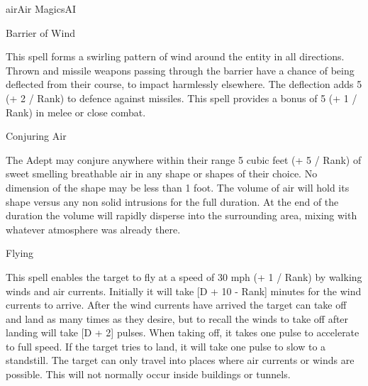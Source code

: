 \begin{College}[2.1]{air}{Air Magics}{AI}
\begin{spell}[S-4]{Barrier of Wind}

\begin{effects}
This spell forms a swirling pattern of wind around the entity in all
directions.  Thrown and missile weapons passing through the barrier
have a chance of being deflected from their course, to impact
harmlessly elsewhere.  The deflection adds 5 (+ 2 / Rank) to defence
against missiles.  This spell provides a bonus of 5 (+ 1 / Rank) in
melee or close combat.
\end{effects}
\end{spell}

\begin{spell}[S-5]{Conjuring Air}

\begin{effects}
The Adept may conjure anywhere within their range 5 cubic feet (+ 5 /
Rank) of sweet smelling breathable air in any shape or shapes of their
choice.  No dimension of the shape may be less than 1 foot.  The
volume of air will hold its shape versus any non solid intrusions for
the full duration. At the end of the duration the volume will rapidly
disperse into the surrounding area, mixing with whatever atmosphere
was already there.
\end{effects}
\end{spell}

\begin{spell}[S-6]{Flying}

\begin{effects}
This spell enables the target to fly at a speed of 30 mph (+ 1 / Rank)
by walking winds and air currents.  Initially it will take [D + 10 -
  Rank] minutes for the wind currents to arrive.  After the wind
currents have arrived the target can take off and land as many times
as they desire, but to recall the winds to take off after landing will
take [D + 2] pulses.  When taking off, it takes one pulse to
accelerate to full speed.  If the target tries to land, it will take
one pulse to slow to a standstill.  The target can only travel into
places where air currents or winds are possible.  This will not
normally occur inside buildings or tunnels.
\end{effects}
\end{spell}


\end{College}
